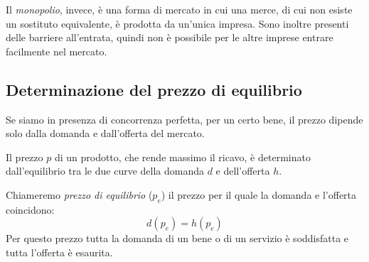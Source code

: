 \vspace{.5em}
Il \emph{monopolio}, invece, è una forma di mercato in cui una merce, di cui 
non esiste un sostituto equivalente, è prodotta da un'unica impresa.
Sono inoltre presenti delle barriere all'entrata, quindi non è possibile per 
le altre imprese entrare facilmente nel mercato. 


\subsection{Determinazione del prezzo di equilibrio}

Se siamo in presenza di concorrenza perfetta, per un certo bene, il prezzo 
dipende solo dalla domanda e dall'offerta del mercato.

Il prezzo \(p\) di un prodotto, che rende massimo il ricavo, è determinato 
dall'equilibrio tra le due curve della domanda \(d\) e dell'offerta \(h\). 


Chiameremo \emph{prezzo di equilibrio} (\(p_e\)) il prezzo per il quale la 
domanda e l'offerta coincidono:
\[d(p_e) = h(p_e)\]
Per questo prezzo tutta la domanda di un bene o di un servizio è soddisfatta 
e tutta l'offerta è esaurita.



